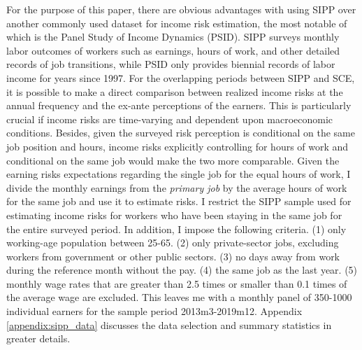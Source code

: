 For the purpose of this paper, there are obvious advantages with using SIPP over another commonly used dataset for income risk estimation, the most notable of which is the Panel Study of Income Dynamics (PSID). SIPP surveys monthly labor outcomes of workers such as earnings, hours of work, and other detailed records of job transitions, while PSID only provides biennial records of labor income for years since 1997. For the  overlapping periods between SIPP and SCE, it is possible to make a direct comparison between realized income risks at the annual frequency and the ex-ante perceptions of the earners. This is particularly crucial if income risks are time-varying and dependent upon macroeconomic conditions. Besides, given the surveyed risk perception is conditional on the same job position and hours, income risks explicitly controlling for hours of work and conditional on the same job would make the two more comparable.   
Given the earning risks expectations regarding the single job for the equal hours of work, I divide the monthly earnings from the \emph{primary job} by the average hours of work for the same job and use it to estimate risks. I restrict the SIPP sample used for estimating income risks for workers who have been staying in the same job for the entire surveyed period. In addition, I impose the following criteria. (1) only working-age population between 25-65. (2) only private-sector jobs, excluding workers from government or other public sectors. (3) no days away from work during the reference month without the pay. (4) the same job as the last year. (5) monthly wage rates that are greater than 2.5 times or smaller than 0.1 times of the average wage are excluded. This leaves me with a monthly panel of 350-1000 individual earners for the sample period 2013m3-2019m12. Appendix \ref{appendix:sipp_data} discusses the data selection and summary statistics in greater details. 